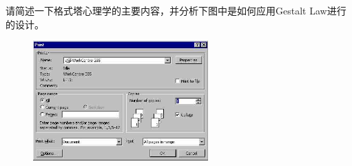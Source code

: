 \begin{problem}[2023]
请简述一下格式塔心理学的主要内容，并分析下图中是如何应用Gestalt Law进行的设计。
\begin{figure}[H]
    \vspace{-0.5em}
    \centering
    \includegraphics[width=0.6\textwidth]{2023格式塔心理学.jpg}
    \vspace{-1em}
\end{figure}
\end{problem}

